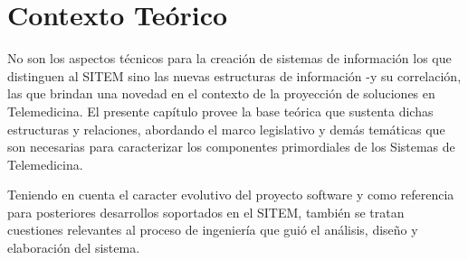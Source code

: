 \chapter{Contexto Teórico}
No son los aspectos técnicos para la creación de sistemas de información los que distinguen al SITEM sino las nuevas estructuras de información -y su correlación, las que brindan una novedad en el contexto de la proyección de soluciones en Telemedicina. El presente capítulo provee la base teórica que sustenta dichas estructuras y relaciones, abordando el marco legislativo y demás temáticas que son necesarias para caracterizar los componentes primordiales de los Sistemas de Telemedicina. 

Teniendo en cuenta el caracter evolutivo del proyecto software y como referencia para posteriores desarrollos soportados en el SITEM, también se tratan cuestiones relevantes al proceso de ingeniería que guió el análisis, diseño y elaboración del sistema.







